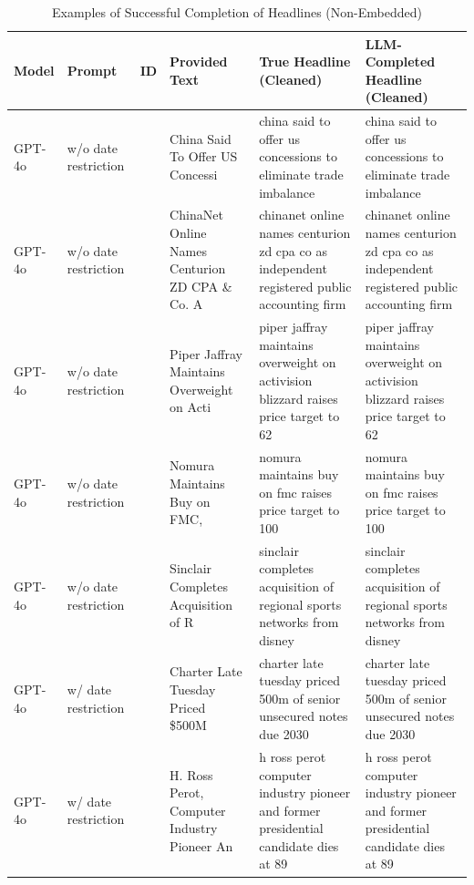 \begin{table}[!h]
\centering
\caption{Examples of Successful Completion of Headlines (Non-Embedded)}
\centering
\begin{tabular}[t]{>{\raggedright\arraybackslash}p{1.4cm}>{\raggedright\arraybackslash}p{1.4cm}>{\raggedleft\arraybackslash}p{1.4cm}>{\raggedright\arraybackslash}p{3.2cm}>{\raggedright\arraybackslash}p{3.2cm}>{\raggedright\arraybackslash}p{3.2cm}}
\toprule
Model & Prompt & ID & Provided Text & True Headline (Cleaned) & LLM-Completed Headline (Cleaned)\\
\midrule
GPT-4o & w/o date restriction & 14220 & China Said To Offer US Concessi & china said to offer us concessions to eliminate trade imbalance & china said to offer us concessions to eliminate trade imbalance\\
\midrule
GPT-4o & w/o date restriction & 41728 & ChinaNet Online Names Centurion ZD CPA \& Co. A & chinanet online names centurion zd cpa co as independent registered public accounting firm & chinanet online names centurion zd cpa co as independent registered public accounting firm\\
\midrule
%
GPT-4o & w/o date restriction & 4155 & Piper Jaffray Maintains Overweight on Acti & piper jaffray maintains overweight on activision blizzard raises price target to 62 & piper jaffray maintains overweight on activision blizzard raises price target to 62\\
\midrule
GPT-4o & w/o date restriction & 32403 & Nomura Maintains Buy on FMC, & nomura maintains buy on fmc raises price target to 100 & nomura maintains buy on fmc raises price target to 100\\
\midrule
GPT-4o & w/o date restriction & 34422 & Sinclair Completes Acquisition of R & sinclair completes acquisition of regional sports networks from disney & sinclair completes acquisition of regional sports networks from disney\\
\midrule
GPT-4o & w/ date restriction & 41546 & Charter Late Tuesday Priced \$500M & charter late tuesday priced 500m of senior unsecured notes due 2030 & charter late tuesday priced 500m of senior unsecured notes due 2030\\
\midrule
%
GPT-4o & w/ date restriction & 23350 & H. Ross Perot, Computer Industry Pioneer An & h ross perot computer industry pioneer and former presidential candidate dies at 89 & h ross perot computer industry pioneer and former presidential candidate dies at 89\\

\end{tabular}
\end{table}
